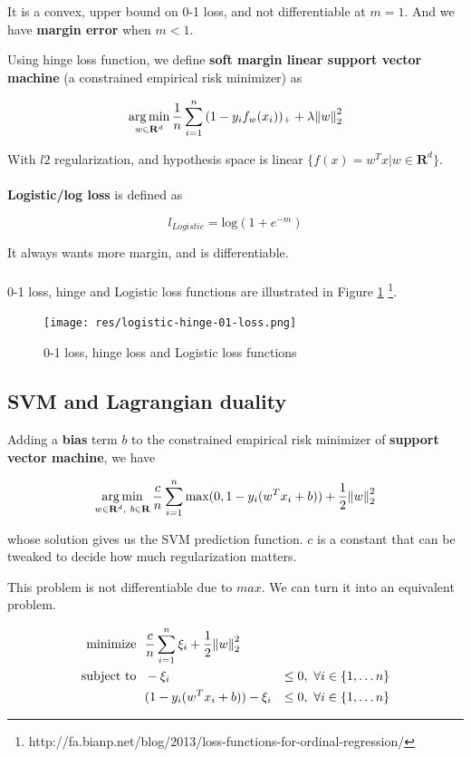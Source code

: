 \documentclass{article}
\DeclareMathOperator*{\argmin}{arg\,min}
\begin{document}
It is a convex, upper bound on 0-1 loss, and not differentiable at $m = 1$.
And we have \textbf{margin error} when $m < 1$.

Using hinge loss function, we define \textbf{soft margin linear support vector machine} (a constrained empirical risk minimizer) as

$$
\argmin_{w \in \mathbf{R}^{d}}{\frac{1}{n} \sum_{i = 1}^{n}{(1 - y_i f_w (x_i))_+} + \lambda \norm{w}_2^2}
$$

With $l2$ regularization, and hypothesis space is linear $\{f(x) = w^{T} x | w \in \mathbf{R}^d\}$.
\\
\\
\textbf{Logistic/log loss} is defined as 

$$
\mathit{l}_{Logistic} = \text{log}(1 + e^{-m})
$$

It always wants more margin, and is differentiable.
\\
\\
0-1 loss, hinge and Logistic loss functions are illustrated in Figure \ref{logistic-hinge-01-loss} \footnote{http://fa.bianp.net/blog/2013/loss-functions-for-ordinal-regression/}.

\begin{figure}[h]
\centering
\texttt{[image: res/logistic-hinge-01-loss.png]}
\caption{0-1 loss, hinge loss and Logistic loss functions}
\label{logistic-hinge-01-loss}
\end{figure}

\subsection{SVM and Lagrangian duality}

Adding a \textbf{bias} term $b$ to the constrained empirical risk minimizer of \textbf{support vector machine}, we have

$$
\argmin_{w \in \mathbf{R}^{d}, ~ b \in \mathbf{R}}{\frac{c}{n} \sum_{i = 1}^{n}{\text{max}(0, 1 - y_i (w^{T} x_i + b))} + \frac{1}{2} {\norm{w}_2^2}}
$$

whose solution gives us the SVM prediction function.
$c$ is a constant that can be tweaked to decide how much regularization matters.

This problem is not differentiable due to $max$.
We can turn it into an equivalent problem.

\begin{align*}
\text{minimize}   ~~& \frac{c}{n} \sum_{i = 1}^{n}{\xi_i} + \frac{1}{2} {\norm{w}_2^2} \\
\text{subject to} ~~& -\xi_i &\leq 0, ~ \forall i \in \{1, \dots n\} \\
                  & (1 - y_i (w^{T} x_i + b)) - \xi_i &\leq 0, ~ \forall i \in \{1, \dots n\}
\end{align*}
\end{document}
